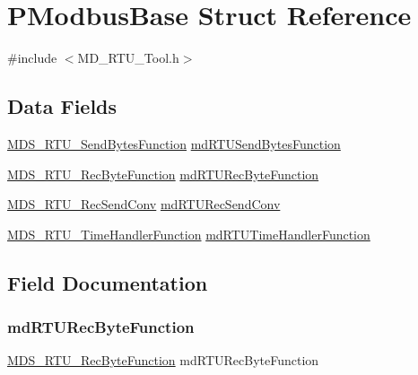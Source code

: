 \hypertarget{struct_p_modbus_base}{}\section{P\+Modbus\+Base Struct Reference}
\label{struct_p_modbus_base}


{\ttfamily \#include $<$M\+D\+\_\+\+R\+T\+U\+\_\+\+Tool.\+h$>$}

\subsection*{Data Fields}
\begin{DoxyCompactItemize}
\item 
\mbox{\hyperlink{_m_d___r_t_u___tool_8h_a772570d4938ab57b56e3a0ffc9d5dc07}{M\+D\+S\+\_\+\+R\+T\+U\+\_\+\+Send\+Bytes\+Function}} \mbox{\hyperlink{struct_p_modbus_base_a6501e05a4890a091acbb26a7d6b8805e}{md\+R\+T\+U\+Send\+Bytes\+Function}}
\item 
\mbox{\hyperlink{_m_d___r_t_u___tool_8h_a30ce081ebf66425c6a1c805bbcacfa36}{M\+D\+S\+\_\+\+R\+T\+U\+\_\+\+Rec\+Byte\+Function}} \mbox{\hyperlink{struct_p_modbus_base_a5b392766c21a4d53e458adad7cddc3e2}{md\+R\+T\+U\+Rec\+Byte\+Function}}
\item 
\mbox{\hyperlink{_m_d___r_t_u___tool_8h_a3c018adc9939498dee8cda0acd6a23a2}{M\+D\+S\+\_\+\+R\+T\+U\+\_\+\+Rec\+Send\+Conv}} \mbox{\hyperlink{struct_p_modbus_base_a5f3eb3756dbefa404fb29004d844a531}{md\+R\+T\+U\+Rec\+Send\+Conv}}
\item 
\mbox{\hyperlink{_m_d___r_t_u___tool_8h_abff31b0ee2eb0ef8f7aea335d64a2177}{M\+D\+S\+\_\+\+R\+T\+U\+\_\+\+Time\+Handler\+Function}} \mbox{\hyperlink{struct_p_modbus_base_a6a04ec0ec269e25d456ad73bded75012}{md\+R\+T\+U\+Time\+Handler\+Function}}
\end{DoxyCompactItemize}


\subsection{Field Documentation}
\mbox{\label{struct_p_modbus_base_a5b392766c21a4d53e458adad7cddc3e2}} 
\subsubsection{\texorpdfstring{md\+R\+T\+U\+Rec\+Byte\+Function}{mdRTURecByteFunction}}
{\footnotesize\ttfamily \mbox{\hyperlink{_m_d___r_t_u___tool_8h_a30ce081ebf66425c6a1c805bbcacfa36}{M\+D\+S\+\_\+\+R\+T\+U\+\_\+\+Rec\+Byte\+Function}} md\+R\+T\+U\+Rec\+Byte\+Function}

